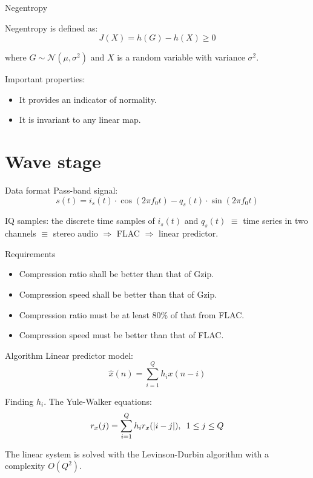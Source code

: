 \documentclass[usenames,dvipsnames]{beamer}
\begin{document}
\begin{frame}{Negentropy}
	
Negentropy is defined as:
\[
J(X) = h(G) - h(X) \geq 0
\]

where $G \sim \mathscr{N}(\mu, \sigma^2)$ and $X$ is a random variable with variance $\sigma^2$.
\vspace{1em}

Important properties:
\begin{itemize}
	\item It provides an indicator of normality.
	\item It is invariant to any linear map.
\end{itemize}
\end{frame}

\section{Wave stage}
\begin{frame}{Data format}
Pass-band signal:
\[
s(t) = i_s(t) \cdot \cos(2\pi f_0 t) - q_s(t) \cdot \sin(2\pi f_0 t)
\]

IQ samples: the discrete time samples of $i_s(t)$ and $q_s(t)$ $\equiv$ time series in two channels $\equiv$ stereo audio $\Rightarrow$ FLAC $\Rightarrow$ linear predictor.
\end{frame}

\begin{frame}{Requirements}
\begin{itemize}
	\item<1-> Compression ratio shall be better than that of Gzip.
	\item<1-> Compression speed shall be better than that of Gzip.
	\item<2-> Compression ratio must be at least 80\% of that from FLAC.
	\item<2-> Compression speed must be better than that of FLAC.
\end{itemize}
\end{frame}

\begin{frame}{Algorithm}
Linear predictor model:
\[
\hat{x}(n) = \sum_{i=1}^{Q} h_i x(n-i)
\]

Finding $h_i$. The Yule-Walker equations:
\[
r_x(j) = \sum_{i=1}^{Q} h_i r_x(|i-j|) ,\hspace{0.5em} 1 \leq j \leq Q
\]

The linear system is solved with the Levinson-Durbin algorithm with a complexity $O(Q^2)$.

\end{frame}
\end{document}
